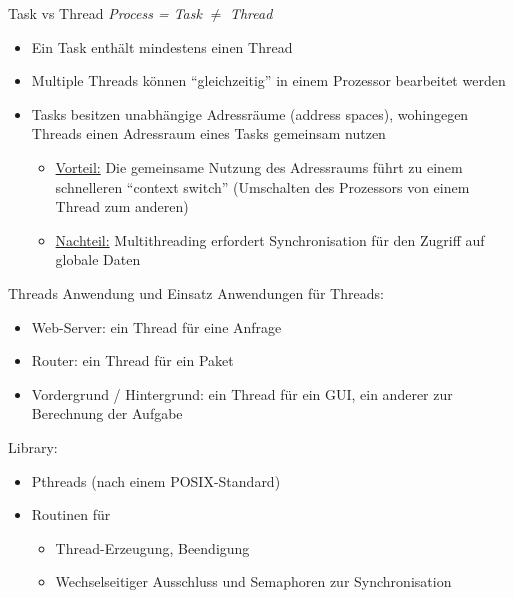 \begin{defi}{Task vs Thread}
    \emph{Process = Task} $\neq$ \emph{Thread}
    \begin{itemize}
        \item Ein Task enthält mindestens einen Thread
        \item Multiple Threads können \enquote{gleichzeitig} in einem Prozessor bearbeitet werden
        \item Tasks besitzen unabhängige Adressräume (address spaces),
              wohingegen Threads einen Adressraum eines Tasks gemeinsam nutzen
              \begin{itemize}
                  \item \underline{Vorteil:} Die gemeinsame Nutzung des Adressraums führt zu einem schnelleren \enquote{context switch}
                        (Umschalten des Prozessors von einem Thread zum anderen)
                  \item \underline{Nachteil:} Multithreading erfordert Synchronisation für den Zugriff auf globale Daten
              \end{itemize}
    \end{itemize}
\end{defi}

\begin{example}{Threads Anwendung und Einsatz}
    Anwendungen für Threads:
    \begin{itemize}
        \item Web-Server: ein Thread für eine Anfrage
        \item Router: ein Thread für ein Paket
        \item Vordergrund / Hintergrund: ein Thread für ein GUI,
              ein anderer zur Berechnung der Aufgabe
    \end{itemize}
    Library:
    \begin{itemize}
        \item Pthreads (nach einem POSIX-Standard)
        \item Routinen für
              \begin{itemize}
                  \item Thread-Erzeugung, Beendigung
                  \item Wechselseitiger Ausschluss und Semaphoren zur Synchronisation
              \end{itemize}
    \end{itemize}
\end{example}


